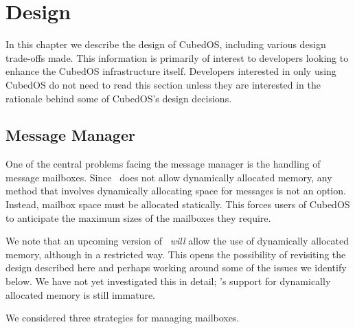 
\section{Design}
\label{sec:design-detailed-design}

In this chapter we describe the design of CubedOS, including various design trade-offs made.
This information is primarily of interest to developers looking to enhance the CubedOS
infrastructure itself. Developers interested in only using CubedOS do not need to read this
section unless they are interested in the rationale behind some of CubedOS's design decisions.

\subsection{Message Manager}
\label{sec:design-message-manager}

One of the central problems facing the message manager is the handling of message mailboxes.
Since \SPARK\ does not allow dynamically allocated memory, any method that involves dynamically
allocating space for messages is not an option. Instead, mailbox space must be allocated
statically. This forces users of CubedOS to anticipate the maximum sizes of the mailboxes they
require.

We note that an upcoming version of \SPARK\ \emph{will} allow the use of dynamically allocated
memory, although in a restricted way. This opens the possibility of revisiting the design
described here and perhaps working around some of the issues we identify below. We have not yet
investigated this in detail; \SPARK's support for dynamically allocated memory is still
immature.

We considered three strategies for managing mailboxes.

